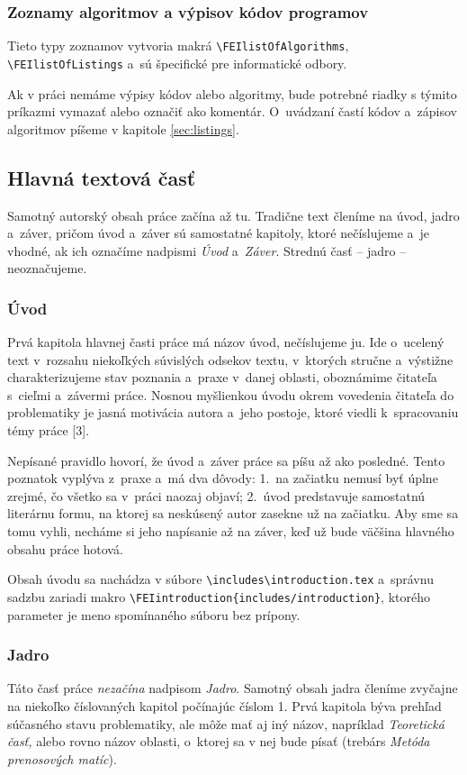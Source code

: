 \subsubsection*{\normalsize Zoznamy algoritmov a výpisov kódov programov}
Tieto typy zoznamov vytvoria makrá \verb|\FEIlistOfAlgorithms|, \verb|\FEIlistOfListings| a~sú špecifické pre informatické odbory.

Ak v práci nemáme výpisy kódov alebo algoritmy, 
bude potrebné riadky s týmito príkazmi vymazať alebo označiť ako komentár. O~uvádzaní častí kódov 
a~zápisov algoritmov píšeme v kapitole \ref{sec:listings}.

\subsection{Hlavná textová časť}
Samotný autorský obsah práce začína až tu.
Tradične text členíme na úvod, jadro a~záver,
pričom úvod a~záver sú samostatné kapitoly,
ktoré nečíslujeme a~je vhodné,
ak ich označíme nadpismi \emph{Úvod} a~\emph{Záver}. 
Strednú časť -- jadro -- neoznačujeme.

\subsubsection{Úvod}
Prvá kapitola hlavnej časti práce má názov úvod, nečíslujeme ju. 
Ide o~ucelený text v~rozsahu niekoľkých súvislých odsekov textu, 
v~ktorých stručne a~výstižne charakterizujeme stav poznania
a~praxe v~danej oblasti,
oboznámime čitateľa s~cieľmi a~závermi práce.
Nosnou myšlienkou úvodu okrem vovedenia čitateľa do problematiky 
je jasná motivácia autora a~jeho postoje,
ktoré viedli k~spracovaniu témy práce [3].

Nepísané pravidlo hovorí,
že úvod a~záver práce sa píšu až ako posledné.
Tento poznatok vyplýva z~praxe a~má dva dôvody:
1.~na začiatku nemusí byť úplne zrejmé, čo všetko sa v~práci naozaj objaví;
2.~úvod predstavuje samostatnú literárnu formu,
na ktorej sa neskúsený autor zasekne už na začiatku.
Aby sme sa tomu vyhli,
necháme si jeho napísanie až na záver,
keď už bude väčšina hlavného obsahu práce hotová.

Obsah úvodu sa nachádza v súbore \verb|\includes\introduction.tex|
a~správnu sadzbu zariadi makro \verb|\FEIintroduction{includes/introduction}|, 
ktorého parameter je meno spomínaného súboru bez prípony.

\subsubsection{Jadro}
Táto časť práce \emph{nezačína} nadpisom \emph{Jadro}.
Samotný obsah jadra členíme zvyčajne na niekoľko číslovaných 
kapitol počínajúc číslom 1.
Prvá kapitola býva prehľad súčasného stavu problematiky,
ale môže mať aj iný názov,
napríklad \emph{Teoretická časť,} alebo rovno názov oblasti,
o~ktorej sa v nej bude písať
(trebárs \emph{Metóda prenosových matíc}).

